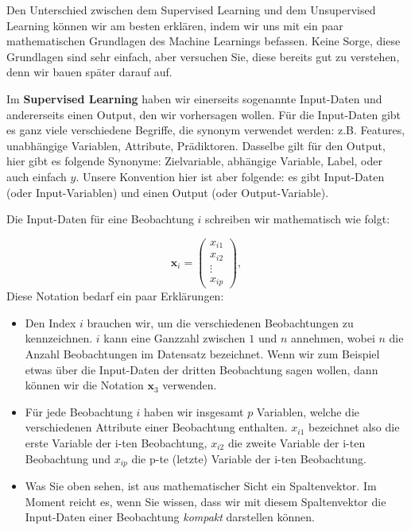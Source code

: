 \documentclass[
]{book}
\providecommand{\tightlist}{%
  \setlength{\itemsep}{0pt}\setlength{\parskip}{0pt}}
\begin{document}
Den Unterschied zwischen dem Supervised Learning und dem Unsupervised Learning können wir am besten erklären, indem wir uns mit ein paar mathematischen Grundlagen des Machine Learnings befassen. Keine Sorge, diese Grundlagen sind sehr einfach, aber versuchen Sie, diese bereits gut zu verstehen, denn wir bauen später darauf auf.

Im \textbf{Supervised Learning} haben wir einerseits sogenannte Input-Daten und andererseits einen Output, den wir vorhersagen wollen. Für die Input-Daten gibt es ganz viele verschiedene Begriffe, die synonym verwendet werden: z.B. Features, unabhängige Variablen, Attribute, Prädiktoren. Dasselbe gilt für den Output, hier gibt es folgende Synonyme: Zielvariable, abhängige Variable, Label, oder auch einfach \(y\). Unsere Konvention hier ist aber folgende: es gibt Input-Daten (oder Input-Variablen) und einen Output (oder Output-Variable).

Die Input-Daten für eine Beobachtung \(i\) schreiben wir mathematisch wie folgt:

\[
\mathbf{x}_i=\begin{pmatrix} x_{i1} \\ x_{i2} \\ \vdots \\ x_{ip} \end{pmatrix},
\]
Diese Notation bedarf ein paar Erklärungen:

\begin{itemize}
\tightlist
\item
  Den Index \(i\) brauchen wir, um die verschiedenen Beobachtungen zu kennzeichnen. \(i\) kann eine Ganzzahl zwischen \(1\) und \(n\) annehmen, wobei \(n\) die Anzahl Beobachtungen im Datensatz bezeichnet. Wenn wir zum Beispiel etwas über die Input-Daten der dritten Beobachtung sagen wollen, dann können wir die Notation \(\mathbf{x}_3\) verwenden.
\item
  Für jede Beobachtung \(i\) haben wir insgesamt \(p\) Variablen, welche die verschiedenen Attribute einer Beobachtung enthalten. \(x_{i1}\) bezeichnet also die erste Variable der i-ten Beobachtung, \(x_{i2}\) die zweite Variable der i-ten Beobachtung und \(x_{ip}\) die p-te (letzte) Variable der i-ten Beobachtung.
\item
  Was Sie oben sehen, ist aus mathematischer Sicht ein Spaltenvektor. Im Moment reicht es, wenn Sie wissen, dass wir mit diesem Spaltenvektor die Input-Daten einer Beobachtung \emph{kompakt} darstellen können.
\end{itemize}
\end{document}
